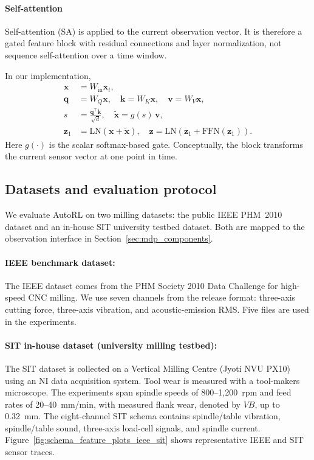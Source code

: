 \documentclass[sn-basic]{sn-jnl}%
\begin{document}
\paragraph{Self-attention}
Self-attention (SA) is applied to the current observation vector. It is therefore a gated feature block with residual connections and layer normalization, not sequence self-attention over a time window.

In our implementation,
\begin{align}
        \mathbf{x} &= W_{\mathrm{in}}\mathbf{x}_t,\\
        \mathbf{q} &= W_Q\mathbf{x},\quad \mathbf{k}=W_K\mathbf{x},\quad \mathbf{v}=W_V\mathbf{x},\\
        s &= \frac{\mathbf{q}^\top\mathbf{k}}{\sqrt{d}},\quad \tilde{\mathbf{x}} = g(s)\,\mathbf{v},\\
        \mathbf{z}_1 &= \mathrm{LN}\!\left(\mathbf{x}+\tilde{\mathbf{x}}\right),\quad
        \mathbf{z}=\mathrm{LN}\!\left(\mathbf{z}_1+\mathrm{FFN}(\mathbf{z}_1)\right).
\end{align}
Here $g(\cdot)$ is the scalar softmax-based gate. Conceptually, the block transforms the current sensor vector at one point in time.
\subsection{Datasets and evaluation protocol} \label{sec:experiment} 

We evaluate AutoRL on two milling datasets: the public IEEE PHM~2010 dataset and an in-house SIT university testbed dataset. Both are mapped to the observation interface in Section~\ref{sec:mdp_components}.%

\paragraph{IEEE benchmark dataset:}
The IEEE dataset \cite{PHMdata2010} comes from the PHM Society 2010 Data Challenge for high-speed CNC milling. We use seven channels from the release format: three-axis cutting force, three-axis vibration, and acoustic-emission RMS. Five files are used in the experiments.

\paragraph{SIT in-house dataset (university milling testbed):}
The SIT dataset is collected on a Vertical Milling Centre (Jyoti NVU PX10) using an NI data acquisition system. Tool wear is measured with a tool-makers microscope. The experiments span spindle speeds of 800--1{,}200~rpm and feed rates of 20--40~mm/min, with measured flank wear, denoted by $VB$,  up to 0.32~mm. The eight-channel SIT schema contains spindle/table vibration, spindle/table sound, three-axis load-cell signals, and spindle current. Figure~\ref{fig:schema_feature_plots_ieee_sit} shows representative IEEE and SIT sensor traces.
\end{document}
